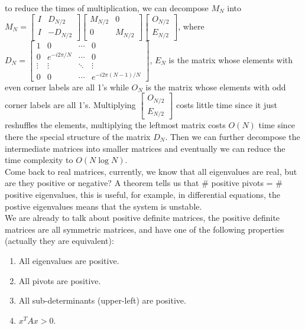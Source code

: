\documentclass{article}
\newcommand{\E}{\mathrm{E}}
\begin{document}
to reduce the times of multiplication, we can decompose \( M_N \) into \( M_N = \begin{bmatrix}
    I & D_{N/2} \\
    I & -D_{N/2}
\end{bmatrix} \begin{bmatrix}
    M_{N/2} & 0 \\
    0 & M_{N/2}
\end{bmatrix}
\begin{bmatrix}
    O_{N/2}    \\
    E_{N/2}
\end{bmatrix}
\), where \( D_N = \begin{bmatrix}
    1 & 0 & \cdots & 0 \\
    0 & e^{-i2\pi/N} & \cdots & 0 \\
    \vdots & \vdots & \ddots & \vdots \\
    0 & 0 & \cdots & e^{-i2\pi(N-1)/N}
\end{bmatrix} \), \( E_N \) is the matrix whose elements with even corner labels are all 1's while
\( O_N \) is the matrix whose elements with odd corner labels are all 1's.
Multiplying \( \begin{bmatrix} O_{N/2} \\E_{N/2} \end{bmatrix} \) costs little time since it just reshuffles the elements, multiplying the leftmost
matrix costs \( O(N) \) time since there the special structure of the matrix \( D_N \). Then we can further decompose the intermediate matrices into smaller matrices and eventually we can reduce the time complexity to \( O(N\log N) \).
\\

Come back to real matrices, currently, we know that all eigenvalues are real, but are they positive or negative? A theorem tells us that \# positive pivots = \# positive eigenvalues, this is useful, for example, in differential equations, the postive eigenvalues means that the system is unstable.
\\

We are already to talk about positive definite matrices, the positive definite matrices are all symmetric matrices, and have one of the following properties (actually they are equivalent):

\begin{enumerate}
    \item All eigenvalues are positive.
    \item All pivots are positive.
    \item All sub-determinants (upper-left) are positive.
    \item \( x^T A x > 0 \).
\end{enumerate}
\end{document}
